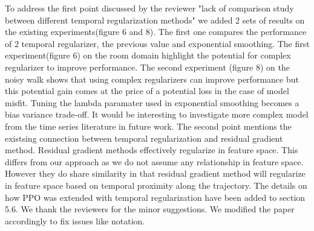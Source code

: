 To address the first point discussed by the reviewer "lack of comparison study between different temporal regularization methods" we added 2 sets of results on the existing experiments(figure 6 and 8). The first one compares the performance of 2 temporal regularizer, the previous value and exponential smoothing. The first experiment(figure 6) on the room domain highlight the potential for complex regularizer to improve performance. The second experiment (figure 8) on the noisy walk shows that using complex regularizers can improve performance but this potential gain comes at the price of a potential loss in the case of model misfit. Tuning the lambda paramater used in exponential smoothing becomes a bias variance trade-off. It would be interesting to investigate more complex model from the time series literature in future work.
The second point mentions the existsing connection between temporal regularization and residual gradient method. Residual gradient methods effectively regularize in feature space. This differs from our approach as we do not assume any relationship in feature space. However they do share similarity in that residual gradient method will regularize in feature space based on temporal proximity along the trajectory.
The details on how PPO was extended with temporal regularization have been added to section 5.6.
We thank the reviewers for the minor suggestions. We modified the paper accordingly to fix issues like notation.